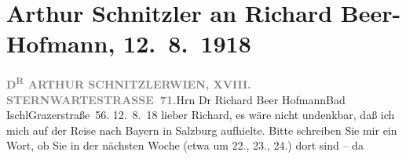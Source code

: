 

         
         \renewcommand{\erwaehntePersonen}{Personen: Richard Beer-Hofmann, Naëmah Beer-Hofmann, Mirjam Beer-Hofmann, Paula Beer-Hofmann, Gabriel Beer-Hofmann, Max Reinhardt}
         \renewcommand{\erwaehnteOrte}{Orte: Bad Ischl, Bayern, Grazer Straße, I., Innere Stadt, Salzburg, Salzburg-Leopoldskron, Sternwartestraße 71, Wien}
         \renewcommand{\erwaehnteWerke}{}
               \section[Arthur Schnitzler an Richard Beer-Hofmann, 12. 8. 1918]{ Arthur Schnitzler an Richard Beer-Hofmann, 12. 8. 1918}\nopagebreak{}\rehead{ }\begin{ledgroupsized}[t]{13cm}\normalsize\beginnumbering{} \toendnotes[C]{\smallbreak\pagebreak[2]} 
\toendnotes[C]{\smallbreak}\pstart{}{\pb}\textcolor{gray}{\textbf{D\textsuperscript{R} ARTHUR SCHNITZLER}}\pend{}\pstart{}\textcolor{gray}{\textbf{WIEN, XVIII. STERNWARTESTRASSE 71.}}\pend{}{\bigskip}\pstart{}Hrn Dr Richard Beer Hofmann\pend{}\pstart{}Bad Ischl\pend{}\pstart{}Grazerstraße 56.\pend{}{\bigskip}\pstart
           \raggedleft{}{\pb}12. 8. 18\pend
           \pstart
           lieber Richard, es wäre nicht undenkbar, daß ich mich auf der Reise
               nach Bayern in Salzburg aufhielte. Bitte schreiben Sie mir ein Wort, ob Sie in der nächsten
               Woche (etwa um 22., 23., 24.) dort sind – da

\end{ledgroupsized}
